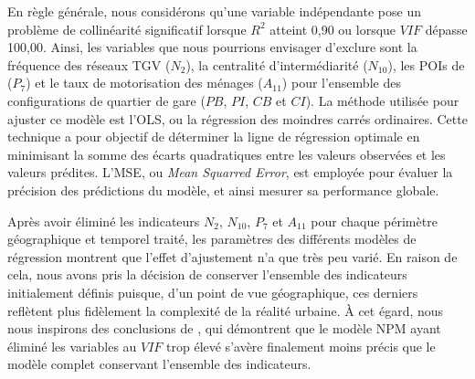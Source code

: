 \begin{refsegment}

En règle générale, nous considérons qu’une variable indépendante pose un problème de collinéarité significatif lorsque \(R^{2}\) atteint 0,90 ou lorsque \(VIF\) dépasse 100,00. Ainsi, les variables que nous pourrions envisager d'exclure sont la fréquence des réseaux \acrshort{TGV} (\(N_{2}\)), la centralité d'intermédiarité (\(N_{10}\)), les \acrshort{POIs} de  (\(P_{7}\)) et le taux de motorisation des ménages (\(A_{11}\)) pour l'ensemble des configurations de quartier de gare (\(PB\), \(PI\), \(CB\) et \(CI\)). La méthode utilisée pour ajuster ce modèle est l'\acrfull{OLS}, ou la régression des moindres carrés ordinaires. Cette technique a pour objectif de déterminer la ligne de régression optimale en minimisant la somme des écarts quadratiques entre les valeurs observées et les valeurs prédites. L'\acrfull{MSE}, ou \textsl{Mean Squarred Error}, est employée pour évaluer la précision des prédictions du modèle, et ainsi mesurer sa performance globale.%

Après avoir éliminé les indicateurs \(N_{2}\), \(N_{10}\), \(P_{7}\) et \(A_{11}\) pour chaque périmètre géographique et temporel traité, les paramètres des différents modèles de régression montrent que l'effet d'ajustement n'a que très peu varié. En raison de cela, nous avons pris la décision de conserver l'ensemble des indicateurs initialement définis puisque, d'un point de vue géographique, ces derniers reflètent plus fidèlement la complexité de la réalité urbaine. À cet égard, nous nous inspirons des conclusions de \textcolor{blue}{\textcite[16]{cao_coordination_2020}}, qui démontrent que le modèle \acrshort{NPM} ayant éliminé les variables au \(VIF\) trop élevé s'avère finalement moins précis que le modèle complet conservant l'ensemble des indicateurs.%


\end{refsegment}
